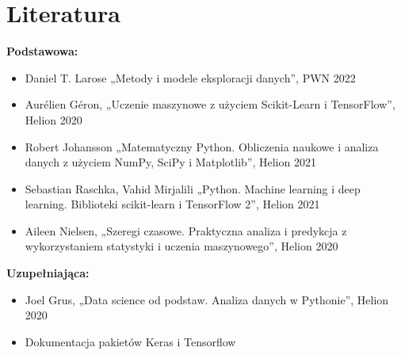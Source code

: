 \documentclass[12pt, a4paper]{article}
\begin{document}
\section{Literatura}

\textbf{Podstawowa:}
\begin{itemize}
  \item Daniel T. Larose „Metody i modele eksploracji danych”, PWN 2022
  \item Aurélien Géron, „Uczenie maszynowe z użyciem Scikit-Learn i TensorFlow”, Helion 2020
  \item Robert Johansson „Matematyczny Python. Obliczenia naukowe i analiza danych z użyciem NumPy, SciPy i Matplotlib”, Helion 2021
  \item Sebastian Raschka, Vahid Mirjalili „Python. Machine learning i deep learning. Biblioteki scikit-learn i TensorFlow 2”, Helion 2021
  \item Aileen Nielsen, „Szeregi czasowe. Praktyczna analiza i predykcja z wykorzystaniem statystyki i uczenia maszynowego”, Helion 2020
\end{itemize}

\textbf{Uzupełniająca:}
\begin{itemize}
  \item Joel Grus, „Data science od podstaw. Analiza danych w Pythonie”, Helion 2020
  \item Dokumentacja pakietów Keras i Tensorflow
\end{itemize}
\end{document}
